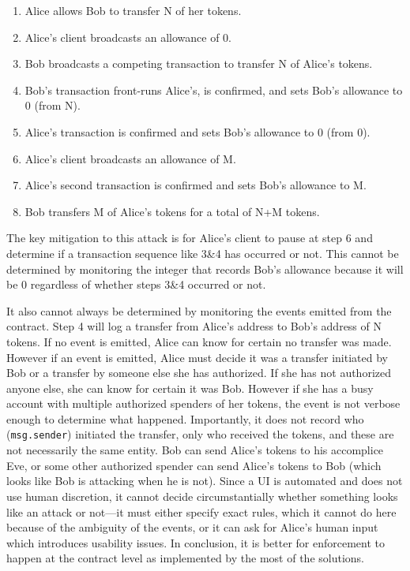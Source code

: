 \begin{enumerate}
	\item Alice allows Bob to transfer N of her tokens.
	\item Alice's client broadcasts an allowance of 0.
	\item Bob broadcasts a competing transaction to transfer N of Alice’s tokens.
	\item Bob's transaction front-runs Alice's, is confirmed, and sets Bob’s allowance to 0 (from N).
	\item Alice’s transaction is confirmed and sets Bob’s allowance to 0 (from 0).
	\item Alice's client broadcasts an allowance of M.
	\item Alice’s second transaction is confirmed and sets Bob's allowance to M.
	\item Bob transfers M of Alice’s tokens for a total of N+M tokens.
\end{enumerate}

The key mitigation to this attack is for Alice's client to pause at step 6 and determine if a transaction sequence like 3\&4 has occurred or not. This cannot be determined by monitoring the integer that records Bob's allowance because it will be 0 regardless of whether steps 3\&4 occurred or not.

It also cannot always be determined by monitoring the events emitted from the contract. Step 4 will log a transfer from Alice's address to Bob's address of N tokens. If no event is emitted, Alice can know for certain no transfer was made. However if an event is emitted, Alice must decide it was a transfer initiated by Bob or a transfer by someone else she has authorized. If she has not authorized anyone else, she can know for certain it was Bob. However if she has a busy account with multiple authorized spenders of her tokens, the event is not verbose enough to determine what happened. Importantly, it does not record who (\texttt{msg.sender}) initiated the transfer, only who received the tokens, and these are not necessarily the same entity. Bob can send Alice's tokens to his accomplice Eve, or some other authorized spender can send Alice's tokens to Bob (which looks like Bob is attacking when he is not). Since a UI is automated and does not use human discretion, it cannot decide circumstantially whether something looks like an attack or not---it must either specify exact rules, which it cannot do here because of the ambiguity of the events, or it can ask for Alice's human input which introduces usability issues. In conclusion, it is better for enforcement to happen at the contract level as implemented by the most of the solutions.

